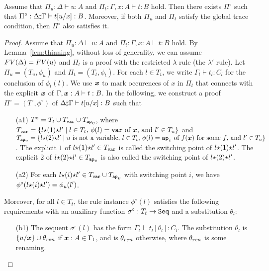 \begin{lemma}
  Assume that $\Pi_u: \Delta \vdash u:A$ and $\Pi_t:\Gamma,x:A \vdash t:B$ hold. 
  Then there exists $\Pi^\circ$ such that $\Pi^\circ:\mergeCtx{\Delta}{\Gamma} \vdash t[u/x]:B$. 
  Moreover, if both $\Pi_u$ and $\Pi_t$ satisfy the global trace condition,
  then $\Pi^\circ$ also satisfies it. 
\end{lemma}
\begin{proof}
  Assume that $\Pi_u: \Delta \vdash u:A$ and $\Pi_t:\Gamma,x:A \vdash t:B$ hold. 
  By Lemma~\ref{lem:thinning}, without loss of generality,
  we can assume $\FV(\Delta) = \FV(u)$ and $\Pi_t$ is a proof with the restricted $\lambda$ rule (the $\lambda'$ rule). 
  Let $\Pi_u=(T_u,\phi_u)$ and $\Pi_t=(T_t,\phi_t)$.
  For each $l\in T_t$, we write $\Gamma_l\vdash t_l:C_l$
  for the conclusion of $\phi_t(l)$.
  We use $\xx$ to mark occurences of $x$ in $\Pi_t$ that connects
  with the explicit $\xx$ of $\Gamma,\xx:A\vdash t:B$. 
  In the following, we construct a proof $\Pi^\circ = (T^\circ,\phi^\circ)$ of
  $\mergeCtx{\Delta}{\Gamma}\vdash t[u/x]:B$ such that 
  \begin{itemize}
  \item[(a1)]
    $T^\circ = T_t \cup T_{\var} \cup T_{\apvar}$, where
    $T_{\var} = \{l\conc(1)\conc l' \mid \text{$l\in T_t$, $\phi(l)=\var$ of $\xx$, and $l'\in T_u$} \}$
    and
    $T_{\apvar} = \{l\conc(2)\conc l' \mid \text{$u$ is not a variable, $l\in T_t$, $\phi(l)=\apvar$ of $f(\xx)$ for some $f$, and $l'\in T_u$}\}$.
    The explicit $1$ of $l\conc(1)\conc l' \in T_\var$ is called the switching point of $l\conc(1)\conc l'$.
    The explicit $2$ of $l\conc(2)\conc l' \in T_\apvar$ is also called the switching point of $l\conc(2)\conc l'$.     \item[(a2)]
    For each $l\conc(i)\conc l' \in T_\var \cup T_\apvar$ with switching point $i$,
    we have $\phi^\circ(l\conc(i)\conc l') = \phi_u(l')$. 
  \end{itemize}
  Moreover, for all $l \in T_t$,
  the rule instance $\phi^\circ(l)$ satisfies the following requirements
  with an auxiliary function $\sigma^\circ:T_t \to \Seq$ and a substitution $\theta_l$: 
  \begin{itemize}
  \item[(b1)]
    The sequent $\sigma^\circ(l)$ has the form $\Gamma^\circ_l\vdash t_l[\theta_l]:C_l$.
    The substitution $\theta_l$ is $\{u/\xx\}\cup\theta_{{\rm ren}}$
    if $\xx:A \in \Gamma_l$, and is $\theta_{{\rm ren}}$ otherwise, 
    where $\theta_{{\rm ren}}$ is some renaming.

\end{itemize}
\end{proof}
